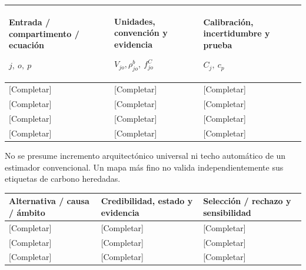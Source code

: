 {\sffamily\fontsize{8.3}{10.3}\selectfont\begin{longtable}{@{}P{54.44mm} P{56.09mm} P{54.44mm}@{}}
\toprule
\textbf{Entrada / compartimento / ecuación}\par {\normalfont\fontsize{8.2}{10}\selectfont $j,\ o,\ p$} & \textbf{Unidades, convención y evidencia}\par {\normalfont\fontsize{8.2}{10}\selectfont $V_{jo},\rho^b_{jo},\ f^C_{jo}$} & \textbf{Calibración, incertidumbre y prueba}\par {\normalfont\fontsize{8.2}{10}\selectfont $C_j,\ c_p$}\\\midrule\endhead
\rule{0pt}{7.7mm}[Completar] & [Completar] & [Completar]\\\hline
\rule{0pt}{7.7mm}[Completar] & [Completar] & [Completar]\\\hline
\rule{0pt}{7.7mm}[Completar] & [Completar] & [Completar]\\\hline
\rule{0pt}{7.7mm}[Completar] & [Completar] & [Completar]\\\hline
\end{longtable}}
\begin{Notice}No se presume incremento arquitectónico universal ni techo automático de un estimador convencional. Un mapa más fino no valida independientemente sus etiquetas de carbono heredadas.\end{Notice}
{\sffamily\fontsize{8.3}{10.3}\selectfont\begin{longtable}{@{}P{56.09mm} P{54.44mm} P{54.44mm}@{}}
\toprule
\textbf{Alternativa / causa / ámbito} & \textbf{Credibilidad, estado y evidencia} & \textbf{Selección / rechazo y sensibilidad}\\\midrule\endhead
\rule{0pt}{7.7mm}[Completar] & [Completar] & [Completar]\\\hline
\rule{0pt}{7.7mm}[Completar] & [Completar] & [Completar]\\\hline
\rule{0pt}{7.7mm}[Completar] & [Completar] & [Completar]\\\hline
\end{longtable}}

